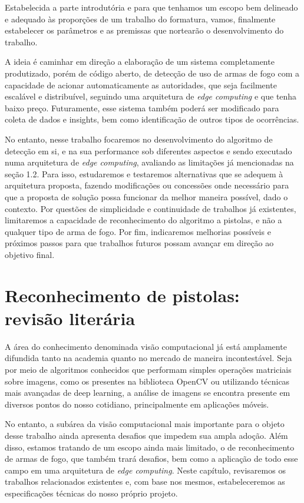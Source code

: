 \documentclass[]{politex}
\begin{document}
Estabelecida a parte introdutória e para que tenhamos um escopo bem delineado e adequado às proporções de um trabalho do formatura, vamos, finalmente estabelecer os parâmetros e as premissas que nortearão o desenvolvimento do trabalho.

A ideia é caminhar em direção a elaboração de um sistema completamente produtizado, porém de código aberto, de detecção de uso de armas de fogo com a capacidade de acionar automaticamente as autoridades, que seja facilmente escalável e distribuível, seguindo uma arquitetura de \textit{edge computing} e que tenha baixo preço. Futuramente, esse sistema também poderá ser modificado para coleta de dados e insights, bem como identificação de outros tipos de ocorrências.

No entanto, nesse trabalho focaremos no desenvolvimento do algoritmo de detecção em si, e na sua performance sob diferentes aspectos e sendo executado numa arquitetura de \textit{edge computing}, avaliando as limitações já mencionadas na seção 1.2. Para isso, estudaremos e testaremos alternativas que se adequem à arquitetura proposta, fazendo modificações ou concessões onde necessário para que a proposta de solução possa funcionar da melhor maneira possível, dado o contexto. Por questões de simplicidade e continuidade de trabalhos já existentes, limitaremos a capacidade de reconhecimento do algoritmo a pistolas, e não a qualquer tipo de arma de fogo. Por fim, indicaremos melhorias possíveis e próximos passos para que trabalhos futuros possam avançar em direção ao objetivo final.

\chapter{Reconhecimento de pistolas: revisão literária}

A área do conhecimento denominada visão computacional já está amplamente difundida tanto na academia quanto no mercado de maneira incontestável. Seja por meio de algoritmos conhecidos que performam simples operações matriciais sobre imagens, como os presentes na biblioteca OpenCV\cite{opencv} ou utilizando técnicas mais avançadas de deep learning, a análise de imagens se encontra presente em diversos pontos do nosso cotidiano, principalmente em aplicações móveis.

No entanto, a subárea da visão computacional mais importante para o objeto desse trabalho ainda apresenta desafios que impedem sua ampla adoção. Além disso, estamos tratando de um escopo ainda mais limitado, o de reconhecimento de armas de fogo, que também trará desafios, bem como a aplicação de todo esse campo em uma arquitetura de \textit{edge computing}. Neste capítulo, revisaremos os trabalhos relacionados existentes e, com base nos mesmos, estabeleceremos as especificações técnicas do nosso próprio projeto.
\end{document}
